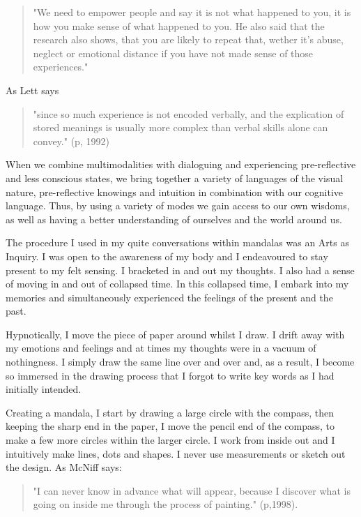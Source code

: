 \begin{quotation}
"We need to empower people and say it is not what happened to you, it is how you make sense of what happened to you. He also said that the research also shows, that you are likely to repeat that, wether it's abuse, neglect or emotional distance if you have not made sense of those experiences." 
\end{quotation}

As Lett says 
\begin{quote}"since so much experience is not encoded verbally, and the explication of stored meanings is usually more complex than verbal skills alone can convey." (p, 1992) 
\end{quote}

When we combine multimodalities with dialoguing and experiencing pre-reflective and less conscious states, we bring together a variety of languages of the visual nature, pre-reflective knowings and intuition in combination with our cognitive language. Thus, by using a variety of modes we gain access to our own wisdoms, as well as having a better understanding of ourselves and the world around us. 

The procedure I used in my quite conversations within mandalas was an Arts as Inquiry. I was open to the awareness of my body and I endeavoured to stay present to my felt sensing. I bracketed in and out my thoughts. I also had a sense of moving in and out of collapsed time. In this collapsed time, I embark into my memories and simultaneously experienced the feelings of the present and the past. 

Hypnotically, I move the piece of paper around whilst I draw. I drift away with my emotions and feelings and at times my thoughts were in a vacuum of nothingness. I simply draw the same line over and over and, as a result, I become so immersed in the drawing process that I forgot to write key words as I had initially intended. 

Creating a mandala, I start by drawing a large circle with the compass, then keeping the sharp end in the paper, I move the pencil end of the compass, to make a few more circles within the larger circle.  I work from inside out and I intuitively make lines, dots and shapes. I never use measurements or sketch out the design. As McNiff says:
\begin{quote} "I can never know in advance what will appear, because I discover what is going on inside me through the process of painting." (p,1998). 
\end{quote}

